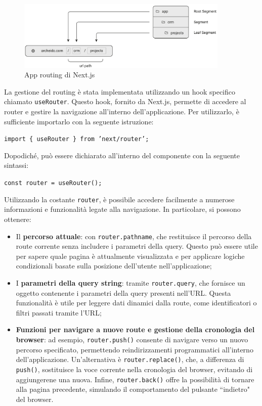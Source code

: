 \documentclass[target=bach,aauheader=,style=]{thud}
\begin{document}
\begin{figure}[H]
    \centering
    \includegraphics[width=0.9\textwidth]{img/routing.pdf} 
    \caption{App routing \cite{nextjsdocs2024} di Next.js}
    \label{app_routing_folders}
\end{figure}

\noindent La gestione del routing è stata implementata utilizzando un hook specifico chiamato \texttt{useRouter}. Questo hook, fornito da Next.js, permette di accedere al router e gestire la navigazione all'interno dell'applicazione. Per utilizzarlo, è sufficiente importarlo con la seguente istruzione:

\begin{center}
    \texttt{import \{ useRouter \} from 'next/router';}
\end{center}

\noindent Dopodiché, può essere dichiarato all'interno del componente con la seguente sintassi:

\begin{center}
    \texttt{const router = useRouter();}
\end{center}

\noindent Utilizzando la costante \texttt{router}, è possibile accedere facilmente a numerose informazioni e funzionalità legate alla navigazione. In particolare, si possono ottenere:

\begin{itemize} 
    \item Il \textbf{percorso attuale}: con \texttt{router.pathname}, che restituisce il percorso della route corrente senza includere i parametri della query. Questo può essere utile per sapere quale pagina è attualmente visualizzata e per applicare logiche condizionali basate sulla posizione dell'utente nell'applicazione;
    \item I \textbf{parametri della query string}: tramite \texttt{router.query}, che fornisce un oggetto contenente i parametri della query presenti nell'URL. Questa funzionalità è utile per leggere dati dinamici dalla route, come identificatori o filtri passati tramite l'URL;
    \item \textbf{Funzioni per navigare a nuove route e gestione della cronologia del browser}: ad esempio, \texttt{router.push()} consente di navigare verso un nuovo percorso specificato, permettendo reindirizzamenti programmatici all'interno dell'applicazione. Un'alternativa è \texttt{router.replace()}, che, a differenza di \texttt{push()}, sostituisce la voce corrente nella cronologia del browser, evitando di aggiungerene una nuova. Infine, \texttt{router.back()} offre la possibilità di tornare alla pagina precedente, simulando il comportamento del pulsante ``indietro" del browser.
\end{itemize}
\end{document}
